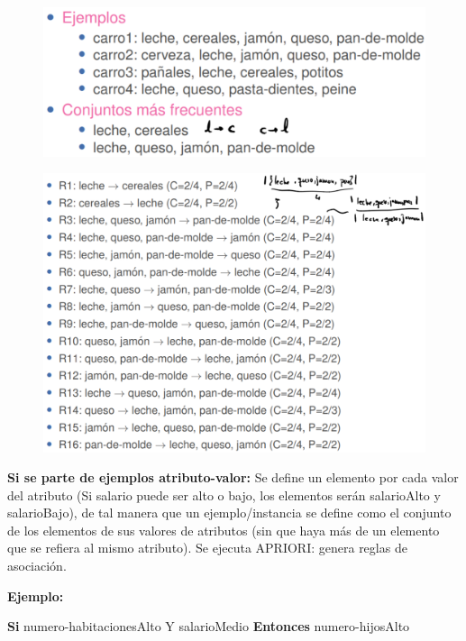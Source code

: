 \documentclass[12pt, twoside, openright]{report} %
\begin{document}
\begin{figure}[H]
	{\includegraphics[scale=.3]{2021-04-10 01_17_45-ensembles-reglasAsociacion.pdf - Foxit Reader.png}}
\end{figure}

\begin{figure}[H]
	{\includegraphics[scale=.3]{2021-04-10 01_18_02-ensembles-reglasAsociacion.pdf - Foxit Reader.png}}
\end{figure}

\textbf{Si se parte de ejemplos atributo-valor:} Se define un elemento por cada valor del atributo (Si salario puede ser alto o bajo, los elementos serán salarioAlto y salarioBajo), de tal manera que un ejemplo/instancia se define como el conjunto de los elementos de sus valores de atributos (sin que haya más de un elemento que se refiera al mismo atributo). Se ejecuta APRIORI: genera reglas de asociación.

\textbf{Ejemplo:}

\textbf{Si} numero-habitacionesAlto Y salarioMedio \textbf{Entonces} numero-hijosAlto
\end{document}
